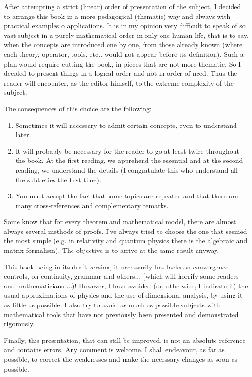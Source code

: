 	After attempting a strict (linear) order of presentation of the subject, I decided to arrange this book in a more pedagogical (thematic) way and always with practical examples o applications. It is in my opinion very difficult to speak of so vast subject in a purely mathematical order in only one human life, that is to say, when the concepts are introduced one by one, from those already known (where each theory, operator, tools, etc.. would not appear before its definition). Such a plan would require cutting the book, in pieces that are not more thematic. So I decided to present things in a logical order and not in order of need. Thus the reader will encounter, as the editor himself, to the extreme complexity of the subject.

	The consequences of this choice are the following:
	\begin{enumerate}
		\item Sometimes it will necessary to admit certain concepts, even to understand later.
	
		\item It will probably be necessary for the reader to go at least twice throughout the book. At the first reading, we apprehend the essential and at the second reading, we understand the details (I congratulate this who understand all the subtleties the first time).
	
		\item You must accept the fact that some topics are repeated and that there are many cross-references and complementary remarks.
	\end{enumerate}
	
	Some know that for every theorem and mathematical model, there are almost always several methods of proofs. I've always tried to choose the one that seemed the most simple (e.g. in relativity and quantum physics there is the algebraic and matrix formalism). The objective is to arrive at the same result anyway.
	
	This book being in its draft version, it necessarily has lacks on convergence controls, on continuity, grammar and others... (which will horrify some readers and mathematicians ...)! However, I have avoided (or, otherwise, I indicate it) the usual approximations of physics and the use of dimensional analysis, by using it as little as possible. I also try to avoid as much as possible subjects with mathematical tools that have not previously been presented and demonstrated rigorously.
	
	Finally, this presentation, that can still be improved, is not an absolute reference and contains errors. Any comment is welcome. I shall endeavour, as far as possible, to correct the weaknesses and make the necessary changes as soon as possible.
	
